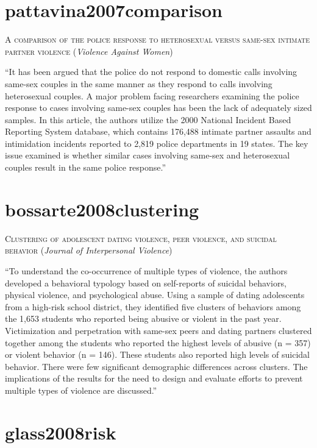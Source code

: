 \documentclass[]{tufte-handout}
\begin{document}
\section{\texorpdfstring{\textcolor[HTML]{5b0057}{pattavina2007comparison}}{}}\label{section-34}

\textsc{\large{A comparison of the police response to heterosexual versus same-sex intimate partner violence}}
(\emph{Violence Against Women})

``It has been argued that the police do not respond to domestic calls
involving same-sex couples in the same manner as they respond to calls
involving heterosexual couples. A major problem facing researchers
examining the police response to cases involving same-sex couples has
been the lack of adequately sized samples. In this article, the authors
utilize the 2000 National Incident Based Reporting System database,
which contains 176,488 intimate partner assaults and intimidation
incidents reported to 2,819 police departments in 19 states. The key
issue examined is whether similar cases involving same-sex and
heterosexual couples result in the same police response.''

\section{\texorpdfstring{\textcolor[HTML]{5b0057}{bossarte2008clustering}}{}}\label{section-35}

\textsc{\large{Clustering of adolescent dating violence, peer violence, and suicidal behavior}}
(\emph{Journal of Interpersonal Violence})

``To understand the co-occurrence of multiple types of violence, the
authors developed a behavioral typology based on self-reports of
suicidal behaviors, physical violence, and psychological abuse. Using a
sample of dating adolescents from a high-risk school district, they
identified five clusters of behaviors among the 1,653 students who
reported being abusive or violent in the past year. Victimization and
perpetration with same-sex peers and dating partners clustered together
among the students who reported the highest levels of abusive (n = 357)
or violent behavior (n = 146). These students also reported high levels
of suicidal behavior. There were few significant demographic differences
across clusters. The implications of the results for the need to design
and evaluate efforts to prevent multiple types of violence are
discussed.''

\section{\texorpdfstring{\textcolor[HTML]{5b0057}{glass2008risk}}{}}\label{section-36}
\end{document}
